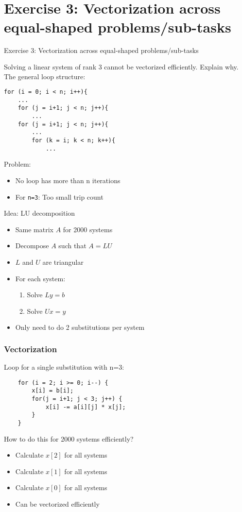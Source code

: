 \section{Exercise 3: Vectorization across equal-shaped problems/sub-tasks}

\begin{frame}{}
\begin{center}
{\Huge Exercise 3: Vectorization across equal-shaped problems/sub-tasks}
\end{center}
\end{frame}

\begin{frame}[fragile]{Solving a linear system of rank 3 cannot be vectorized efficiently. Explain why.}
The general loop structure:
\codestylec
\begin{lstlisting}
for (i = 0; i < n; i++){
    ...
    for (j = i+1; j < n; j++){
        ...
    for (j = i+1; j < n; j++){
        ...
        for (k = i; k < n; k++){
            ...                   
\end{lstlisting}
Problem:
\begin{itemize}
\item No loop has more than n iterations
\item For \texttt{n=3}: Too small trip count
\end{itemize}
\end{frame}

\begin{frame}{Idea: LU decomposition}
\begin{itemize}
\item Same matrix $A$ for 2000 systems
\item Decompose $A$ such that $A = LU$
\item $L$ and $U$ are triangular
\item For each system:
	\begin{enumerate}
	\item Solve $Ly = b$
	\item Solve $Ux = y$
	\end{enumerate}
\item Only need to do 2 substitutions per system
\end{itemize}
\end{frame}

\begin{frame}[fragile]
\frametitle{Vectorization}
Loop for a single substitution with n=3:
\codestylec
\begin{lstlisting}
    for (i = 2; i >= 0; i--) {
        x[i] = b[i];
        for(j = i+1; j < 3; j++) {
            x[i] -= a[i][j] * x[j];
        }
    }                  
\end{lstlisting}
How to do this for 2000 systems efficiently?
\begin{itemize}
\item Calculate $x[2]$ for all systems
\item Calculate $x[1]$ for all systems
\item Calculate $x[0]$ for all systems
\item Can be vectorized efficiently
\end{itemize}
\end{frame}

